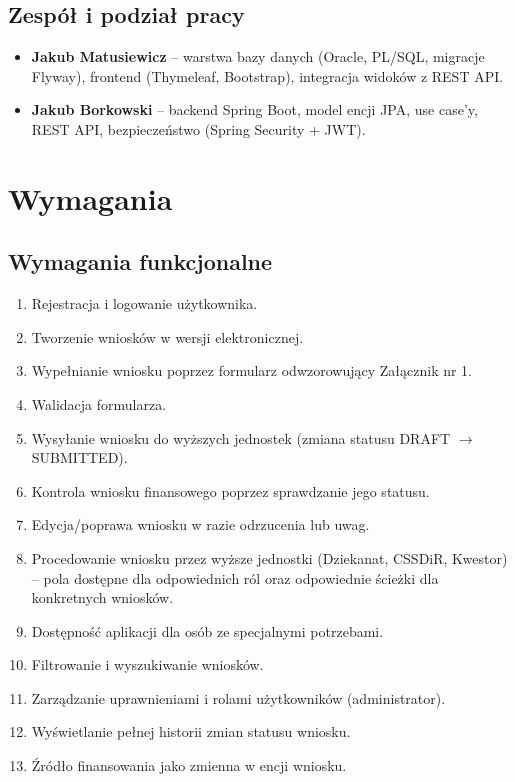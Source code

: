 \documentclass[12pt,a4paper]{article}
\begin{document}
\subsection{Zespół i podział pracy}
\begin{itemize}[leftmargin=*]
  \item \textbf{Jakub Matusiewicz} -- warstwa bazy danych (Oracle, PL/SQL, migracje Flyway),
    frontend (Thymeleaf, Bootstrap), integracja widoków z REST API.
  \item \textbf{Jakub Borkowski} -- backend Spring Boot, model encji JPA, use case'y,
    REST API, bezpieczeństwo (Spring Security + JWT).
\end{itemize}

\section{Wymagania}
\label{sec:wymagania}

\subsection{Wymagania funkcjonalne}
\begin{enumerate}[leftmargin=*]
  \item Rejestracja i logowanie użytkownika.
  \item Tworzenie wniosków w wersji elektronicznej.
  \item Wypełnianie wniosku poprzez formularz odwzorowujący Załącznik nr 1.
  \item Walidacja formularza.
  \item Wysyłanie wniosku do wyższych jednostek (zmiana statusu DRAFT $\to$ SUBMITTED).
  \item Kontrola wniosku finansowego poprzez sprawdzanie jego statusu.
  \item Edycja/poprawa wniosku w razie odrzucenia lub uwag.
  \item Procedowanie wniosku przez wyższe jednostki (Dziekanat, CSSDiR, Kwestor) -- pola
        dostępne dla odpowiednich ról oraz odpowiednie ścieżki dla konkretnych wniosków.
  \item Dostępność aplikacji dla osób ze specjalnymi potrzebami.
  \item Filtrowanie i wyszukiwanie wniosków.
  \item Zarządzanie uprawnieniami i rolami użytkowników (administrator).
  \item Wyświetlanie pełnej historii zmian statusu wniosku.
  \item Źródło finansowania jako zmienna w encji wniosku.
\end{enumerate}
\end{document}
